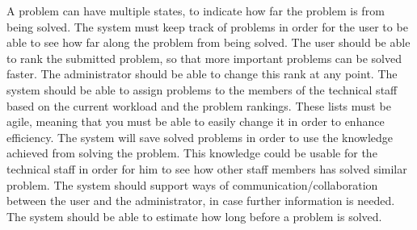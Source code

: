 A problem can have multiple states, to indicate how far the problem is from being solved.
The system must keep track of problems in order for the user to be able to see how far along the problem from being solved. The user should be able to rank the submitted problem, so that more important problems can be solved faster. The administrator should be able to change this rank at any point. 
The system should be able to assign problems to the members of the technical staff based on the current workload and the problem rankings. These lists must be agile, meaning that you must be able to easily change it in order to enhance efficiency.
The system will save solved problems in order to use the knowledge achieved from solving the problem. This knowledge could be usable for the technical staff in order for him to see how other staff members has solved similar problem. The system should support ways of communication/collaboration between the user and the administrator, in case further information is needed. The system should be able to estimate how long before a problem is solved.
